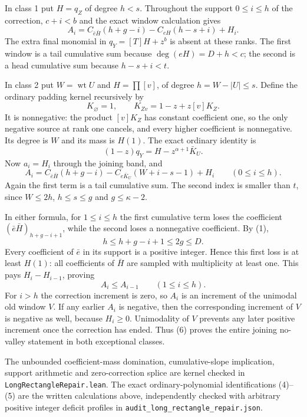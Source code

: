 In class 1 put $H=q_Z$ of degree $h<s$. Throughout the
support $0\le i\le h$ of the correction, $c+i<b$ and
the exact window calculation gives
\[
 A_i=C_{\bar e\bar H}(h+g-i)
                -C_{eH}(h-s+i)+H_i.                   \tag{4}
\]
The extra final monomial in $q_Y=[T]H+z^b$ is absent at
these ranks. The first window is a tail cumulative sum
because $\deg(eH)=D+h<c$; the second is a head cumulative
sum because $h-s+i<t$.

In class 2 put $W=\operatorname{wt}U$ and
$H=\prod[v]$, of degree $h=W-|U|\le s$.
Define the ordinary padding kernel recursively by
\[
 K_\varnothing=1,\qquad K_{Zv}=1-z+z[v]K_Z.
\]
It is nonnegative: the product $[v]K_Z$ has constant
coefficient one, so the only negative source at rank one
cancels, and every higher coefficient is nonnegative.
Its degree is $W$ and its mass is $H(1)$.
The exact ordinary identity is
\[
                       (1-z)q_Y=H-z^{\alpha+1}\bar K_U.
\]
Now $a_i=H_i$ through the joining band, and
\[
 A_i=C_{\bar e\bar H}(h+g-i)
                  -C_{e\bar K_U}(W+i-s-1)+H_i
                                    \qquad(0\le i\le h).       \tag{5}
\]
Again the first term is a tail cumulative sum. The second
index is smaller than $t$, since $W\le2h$, $h\le s\le g$
and $g\le\kappa-2$.

In either formula, for $1\le i\le h$ the first cumulative
term loses the coefficient
$(\bar e\bar H)_{h+g-i+1}$, while the second loses a
nonnegative coefficient. By (1),
\[
                  h\le h+g-i+1\le2g\le D.
\]
Every coefficient of $\bar e$ in its support is a positive
integer. Hence this first loss is at least $H(1)$: all
coefficients of $\bar H$ are sampled with multiplicity at
least one. This pays $H_i-H_{i-1}$, proving
\[
                         A_i\le A_{i-1}\qquad(1\le i\le h).
                                                               \tag{6}
\]
For $i>h$ the correction increment is zero, so $A_i$ is
an increment of the unimodal old window $V$. If any
earlier $A_i$ is negative, then the corresponding increment
of $V$ is negative as well, because $H_i\ge0$.
Unimodality of $V$ prevents any later positive increment
once the correction has ended. Thus (6) proves the entire
joining no-valley statement in both exceptional classes.

The unbounded coefficient-mass domination, cumulative-slope
implication, support arithmetic and zero-correction splice
are kernel checked in \texttt{LongRectangleRepair.lean}.
The exact ordinary-polynomial identifications (4)--(5)
are the written calculations above, independently checked
with arbitrary positive integer deficit profiles in
\texttt{audit\_long\_rectangle\_repair.json}.

